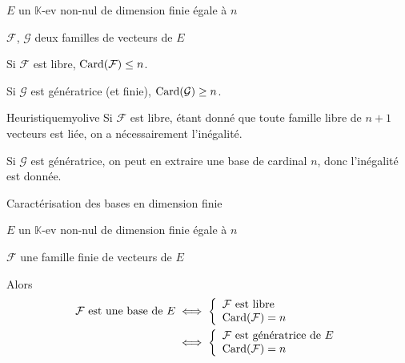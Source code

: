     \begin{prop}{}{}
        \begin{soient}
            \item $E$ un $\mathbb{K}$-ev non-nul de dimension finie égale à $n$
            \item $\mathcal{F}$, $\mathcal{G}$ deux familles de vecteurs de $E$
        \end{soient}
        \begin{alors}
            \item Si $\mathcal{F}$ est libre, $\operatorname{Card}(\mathcal{F}) \leq n$.
            \item Si $\mathcal{G}$ est génératrice (et finie), $\operatorname{Card}(\mathcal{G}) \geq n$.
        \end{alors}
    \end{prop}
    
    \begin{demo}{Heuristique}{myolive}
        Si $\mathcal{F}$ est libre, étant donné que toute famille libre de $n+1$ vecteurs est liée, on a nécessairement l’inégalité.
        
        Si $\mathcal{G}$ est génératrice, on peut en extraire une base de cardinal $n$, donc l’inégalité est donnée.
    \end{demo}

    \begin{theo}{Caractérisation des bases en dimension finie}{}
        \begin{soient}
            \item $E$ un $\mathbb{K}$-ev non-nul de dimension finie égale à $n$
            \item $\mathcal{F}$ une famille finie de vecteurs de $E$
        \end{soient}
        Alors \begin{align*}
            \mathcal{F} \text{ est une base de } E & \iff \left\{ \begin{array}{l}
                \mathcal{F} \text{ est libre} \\
                \operatorname{Card}(\mathcal{F}) = n
            \end{array} \right. \\
            & \iff \left\{ \begin{array}{l}
                \mathcal{F} \text{ est génératrice de } E \\
                \operatorname{Card}(\mathcal{F}) = n
            \end{array} \right.
        \end{align*}
    \end{theo}
    
